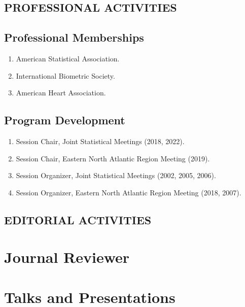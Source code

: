 \documentclass[10pt]{article}
\newcommand{\mydot}[1]{\begin{enumerate}[label=$\circ$,leftmargin=\parindent]\setlength{\itemsep}{#1}}
\newcommand{\ee}{\end{enumerate}}
\newcommand{\mylift}[1]{\vspace*{#1}}
\begin{document}
\subsection*{PROFESSIONAL ACTIVITIES}

\smallskip

\subsection*{Professional Memberships}

\mydot{-0.1em}


\item American Statistical Association.
\item International Biometric Society.
\item American Heart Association.

\ee

\mylift{-1.5em}


\subsection*{Program Development}

\mydot{-0.1em}

\item Session Chair, Joint Statistical Meetings (2018, 2022).
\item Session Chair, Eastern North Atlantic Region Meeting (2019).
\item Session Organizer, Joint Statistical Meetings (2002, 2005, 2006).
\item Session Organizer, Eastern North Atlantic Region Meeting (2018, 2007).

\ee

\subsection*{EDITORIAL ACTIVITIES}

\smallskip


\section{Journal Reviewer}



\section{Talks and Presentations}


\end{document}
